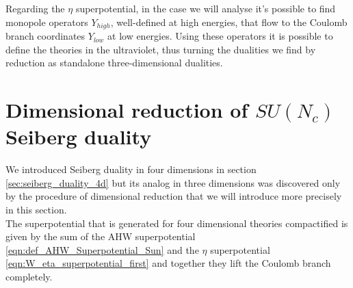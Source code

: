 Regarding the $\eta$ superpotential, in the case we will analyse it's possible to find monopole operators $Y_{high}$, well-defined at high energies, that flow to the Coulomb branch coordinates $Y_{low}$ at low energies. 
Using these operators it is possible to define the theories in the ultraviolet, thus turning the dualities we find by reduction as standalone three-dimensional dualities.


\section{\boldmath Dimensional reduction of $SU(N_c)$ Seiberg duality}
We introduced Seiberg duality in four dimensions in section \ref{sec:seiberg_duality_4d} but its analog in three dimensions was discovered only by the procedure of dimensional reduction that we will introduce more precisely in this section.\\
The superpotential that is generated for four dimensional theories compactified is given by the sum of the AHW superpotential \eqref{eqn:def_AHW_Superpotential_Sun} and the $\eta$ superpotential \eqref{eqn:W_eta_superpotential_first} and together they lift the Coulomb branch completely.

